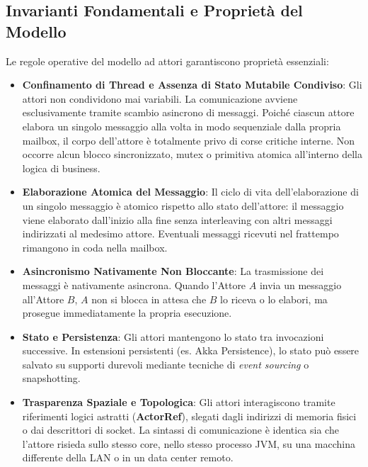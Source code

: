 \subsection{Invarianti Fondamentali e Proprietà del Modello}
Le regole operative del modello ad attori garantiscono proprietà essenziali:
\begin{itemize}
    \item \textbf{Confinamento di Thread e Assenza di Stato Mutabile Condiviso}: Gli attori non condividono mai variabili. La comunicazione avviene esclusivamente tramite scambio asincrono di messaggi. Poiché ciascun attore elabora un singolo messaggio alla volta in modo sequenziale dalla propria mailbox, il corpo dell'attore è totalmente privo di corse critiche interne. Non occorre alcun blocco sincronizzato, mutex o primitiva atomica all'interno della logica di business.
    \item \textbf{Elaborazione Atomica del Messaggio}: Il ciclo di vita dell'elaborazione di un singolo messaggio è atomico rispetto allo stato dell'attore: il messaggio viene elaborato dall'inizio alla fine senza interleaving con altri messaggi indirizzati al medesimo attore. Eventuali messaggi ricevuti nel frattempo rimangono in coda nella mailbox.
    \item \textbf{Asincronismo Nativamente Non Bloccante}: La trasmissione dei messaggi è nativamente asincrona. Quando l'Attore $A$ invia un messaggio all'Attore $B$, $A$ non si blocca in attesa che $B$ lo riceva o lo elabori, ma prosegue immediatamente la propria esecuzione.
    \item \textbf{Stato e Persistenza}: Gli attori mantengono lo stato tra invocazioni successive. In estensioni persistenti (es. Akka Persistence), lo stato può essere salvato su supporti durevoli mediante tecniche di \textit{event sourcing} o snapshotting.
    \item \textbf{Trasparenza Spaziale e Topologica}: Gli attori interagiscono tramite riferimenti logici astratti (\textbf{ActorRef}), slegati dagli indirizzi di memoria fisici o dai descrittori di socket. La sintassi di comunicazione è identica sia che l'attore risieda sullo stesso core, nello stesso processo JVM, su una macchina differente della LAN o in un data center remoto.
\end{itemize}

